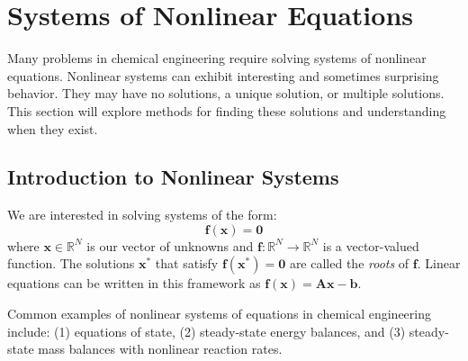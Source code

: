 \chapter{Systems of Nonlinear Equations}
Many problems in chemical engineering require solving systems of nonlinear equations. Nonlinear systems can exhibit interesting and sometimes surprising behavior. They may have no solutions, a unique solution, or multiple solutions. This section will explore methods for finding these solutions and understanding when they exist.

\section{Introduction to Nonlinear Systems}

We are interested in solving systems of the form:
\begin{equation}
\mathbf{f}(\mathbf{x}) = \mathbf{0}
\end{equation}
where $\mathbf{x} \in \mathbb{R}^N$ is our vector of unknowns and $\mathbf{f}: \mathbb{R}^N \rightarrow \mathbb{R}^N$ is a vector-valued function. The solutions $\mathbf{x}^*$ that satisfy $\mathbf{f}(\mathbf{x}^*) = \mathbf{0}$ are called the \textit{roots} of $\mathbf{f}$. Linear equations can be written in this framework as $\mathbf{f}(\mathbf{x}) = \mathbf{A}\mathbf{x} - \mathbf{b}$.

Common examples of nonlinear systems of equations in chemical engineering include: (1) equations of state, (2) steady-state energy balances, and (3) steady-state mass balances with nonlinear reaction rates.

